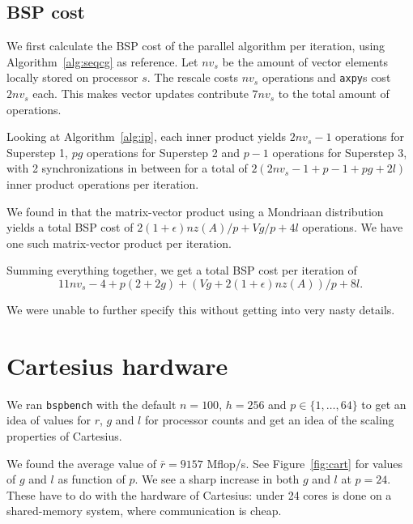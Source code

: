 \documentclass[11pt]{amsart}
\theoremstyle{definition}
\begin{document}
\subsection{BSP cost}
We first calculate the BSP cost of the parallel algorithm per iteration, using Algorithm~\ref{alg:seqcg} as reference. Let $nv_s$ be the amount of vector elements locally stored on processor $s$. The rescale costs $nv_s$ operations and \texttt{axpy}s cost $2nv_s$ each. This makes vector updates contribute $7nv_s$ to the total amount of operations. 

Looking at Algorithm~\ref{alg:ip}, each inner product yields $2nv_s - 1$ operations for Superstep 1, $pg$ operations for Superstep 2 and $p-1$ operations for Superstep 3, with 2 synchronizations in between for a total of $2(2nv_s - 1 + p-1 + pg + 2l)$ inner product operations per iteration.

We found in \cite[p.~189]{biss04} that the matrix-vector product using a Mondriaan distribution yields a total BSP cost of $2(1+\epsilon)nz(A)/p + Vg/p + 4l$ operations. We have one such matrix-vector product per iteration.

Summing everything together, we get a total BSP cost per iteration of
\[
  11nv_s - 4 + p(2+2g) + (Vg + 2 (1+\epsilon)nz(A))/p + 8l.
\]

We were unable to further specify this without getting into very nasty details.

\section{Cartesius hardware}
\label{sec:cart}
We ran \texttt{bspbench} with the default $n=100$, $h=256$ and $p \in \{1, \ldots, 64\}$ to get an idea of values for $r$, $g$ and $l$ for processor counts and get an idea of the scaling properties of Cartesius.

We found the average value of $\bar r = 9157$ Mflop/s. See Figure~\ref{fig:cart} for values of $g$ and $l$ as function of $p$. We see a sharp increase in both $g$ and $l$ at $p=24$. These have to do with the hardware of Cartesius: under 24 cores is done on a shared-memory system, where communication is cheap.
\end{document}
